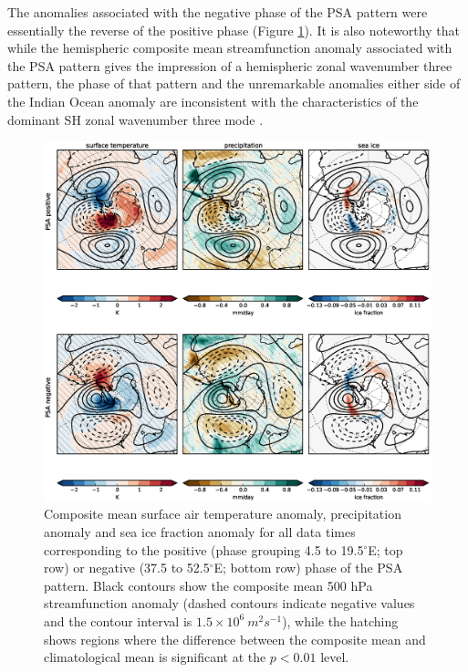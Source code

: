 The anomalies associated with the negative phase of the PSA pattern were essentially the reverse of the positive phase (Figure \ref{fig:surface_composites}). It is also noteworthy that while the hemispheric composite mean streamfunction anomaly associated with the PSA pattern gives the impression of a hemispheric zonal wavenumber three pattern, the phase of that pattern and the unremarkable anomalies either side of the Indian Ocean anomaly are inconsistent with the characteristics of the dominant SH zonal wavenumber three mode \citep[e.g.][]{Raphael2004,IrvingSimmonds2015}.

\begin{figure}
\begin{center}
\includegraphics[width=1\columnwidth]{figures/psa/psa-var-composites-phase-range_ERAInterim_500hPa-lat10S10Nmean-lon115E235Ezeropad_030day-runmean-anom-wrt-all_native-np20N260E.eps}
\caption{\label{fig:surface_composites}
Composite mean surface air temperature anomaly, precipitation anomaly and sea ice fraction anomaly for all data times corresponding to the positive (phase grouping 4.5 to 19.5$^{\circ}$E; top row) or negative (37.5 to 52.5$^{\circ}$E; bottom row) phase of the PSA pattern. Black contours show the composite mean 500 hPa streamfunction anomaly (dashed contours indicate negative values and the contour interval is $1.5 \times 10^6 \: m^2 s^{-1}$), while the hatching shows regions where the difference between the composite mean and climatological mean is significant at the $p < 0.01$ level.%
}
\end{center}
\end{figure}


